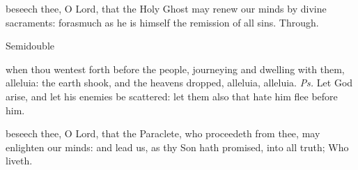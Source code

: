 \postcommunion
{} beseech thee, O Lord, that the Holy Ghost may renew our minds by divine sacraments: forasmuch as he is himself the remission of all sins. Through.

\begin{inhead}
    {Semidouble}
\end{inhead}
\par\noindent
{}

\introit
{} when thou wentest forth before the people, journeying and dwelling with them, alleluia: the earth shook, and the heavens dropped, alleluia, alleluia. \textit{Ps.} Let God arise, and let his enemies be scattered: let them also that hate him flee before him.

\collect
{} beseech thee, O Lord, that the Paraclete, who proceedeth from thee, may enlighten our minds: and lead us, as thy Son hath promised, into all truth; Who liveth.

